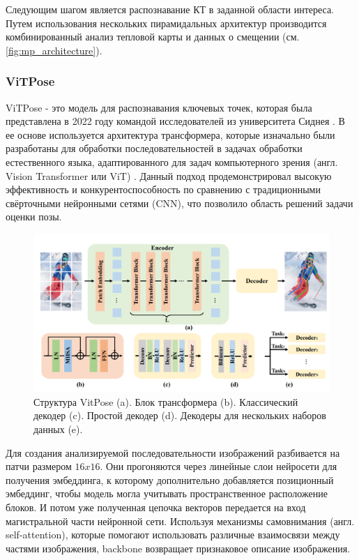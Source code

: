 Следующим шагом является распознавание КТ в заданной области интереса. Путем использования нескольких пирамидальных архитектур производится комбинированный анализ тепловой карты и данных о смещении (см. \autoref{fig:mp_architecture}).

\subsubsection*{ViTPose}

ViTPose - это модель для распознавания ключевых точек, которая была представлена в 2022 году командой исследователей из университета Сиднея \cite{vitpose}. В ее основе используется архитектура трансформера, которые изначально были разработаны для обработки последовательностей в задачах обработки естественного языка, адаптированного для задач компьютерного зрения (англ. Vision Transformer или ViT) \cite{vit}. Данный подход продемонстрировал высокую эффективность и конкурентоспособность по сравнению с традиционными свёрточными нейронными сетями (CNN), что позволило область решений задачи оценки позы.

\begin{figure}[h]
	\centering
	\includegraphics[width=.9\textwidth]{./images/review/vitpose_structure}
	\caption{Структура VitPose (a). Блок трансформера (b). Классический декодер (c). Простой декодер (d). Декодеры для нескольких наборов данных (e). \cite{vitpose}}
	\label{fig:vitpose_structure}
\end{figure}

Для создания анализируемой последовательности изображений разбивается на патчи размером $16x16$. Они прогоняются через линейные слои нейросети для получения эмбеддинга, к которому дополнительно добавляется позиционный эмбеддинг, чтобы модель могла учитывать пространственное расположение блоков. И потом уже полученная цепочка векторов передается на вход магистральной части нейронной сети. Используя механизмы самовнимания (англ. self-attention), которые помогают использовать различные взаимосвязи между частями изображения, backbone возвращает признаковое описание изображения.


